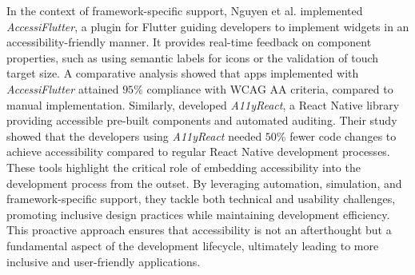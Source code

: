 In the context of framework-specific support, Nguyen et al.\cite{nguyen2022flutter} implemented \textit{AccessiFlutter}, a plugin for Flutter guiding developers to implement widgets in an accessibility-friendly manner. It provides real-time feedback on component properties, such as using semantic labels for icons or the validation of touch target size. A comparative analysis showed that apps implemented with \textit{AccessiFlutter} attained $95$\% compliance with WCAG AA criteria, compared to manual implementation. Similarly, \cite{singh2023react} developed \textit{A11yReact}, a React Native library providing accessible pre-built components and automated auditing. Their study showed that the developers using \textit{A11yReact} needed $50$\% fewer code changes to achieve accessibility compared to regular React Native development processes.\\

These tools highlight the critical role of embedding accessibility into the development process from the outset. By leveraging automation, simulation, and framework-specific support, they tackle both technical and usability challenges, promoting inclusive design practices while maintaining development efficiency. This proactive approach ensures that accessibility is not an afterthought but a fundamental aspect of the development lifecycle, ultimately leading to more inclusive and user-friendly applications.

\newpage